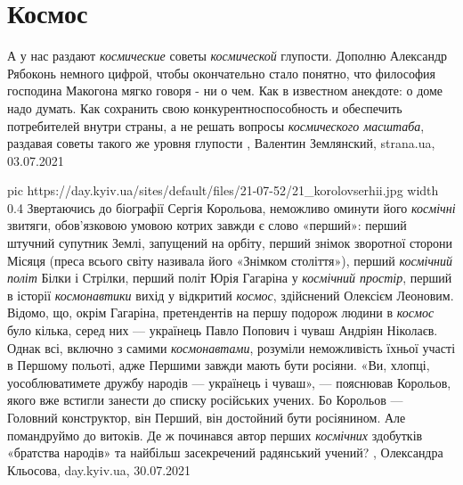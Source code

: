 
 
 
 
 
\chapter{Космос}
\label{sec:slova.kosmos}

А у нас раздают \emph{космические} советы \emph{космической} глупости.  Дополню Александр
Рябоконь немного цифрой, чтобы окончательно стало понятно, что философия
господина Макогона мягко говоря - ни о чем.  Как в известном анекдоте: о доме
надо думать.  Как сохранить свою конкурентноспособность и обеспечить
потребителей внутри страны, а не решать вопросы \emph{космического масштаба}, раздавая
советы такого же уровня глупости
, 
Валентин Землянский, strana.ua, 03.07.2021

\ifcmt
  pic https://day.kyiv.ua/sites/default/files/21-07-52/21_korolovserhii.jpg
  width 0.4
\fi
Звертаючись до біографії Сергія Корольова, неможливо оминути його \emph{космічні}
звитяги, обов’язковою умовою котрих завжди є слово «перший»: перший штучний
супутник Землі, запущений на орбіту, перший знімок зворотної сторони Місяця
(преса всього світу називала його «Знімком століття»), перший \emph{космічний політ}
Білки і Стрілки, перший політ Юрія Гагаріна у \emph{космічний простір}, перший в
історії \emph{космонавтики} вихід у відкритий \emph{космос}, здійснений Олексієм Леоновим.
Відомо, що, окрім Гагаріна, претендентів на першу подорож людини в \emph{космос} було
кілька, серед них — українець Павло Попович і чуваш Андріян Ніколаєв. Однак
всі, включно з самими \emph{космонавтами}, розуміли неможливість їхньої участі в
Першому польоті, адже Першими завжди мають бути росіяни. «Ви, хлопці,
уособлюватимете дружбу народів — українець і чуваш», — пояснював Корольов,
якого вже встигли занести до списку російських учених. Бо Корольов — Головний
конструктор, він Перший, він достойний бути росіянином.
Але помандруймо до витоків. Де ж починався автор перших \emph{космічних} здобутків
«братства народів» та найбільш засекречений радянський учений?
, Олександра Кльосова, day.kyiv.ua, 30.07.2021

